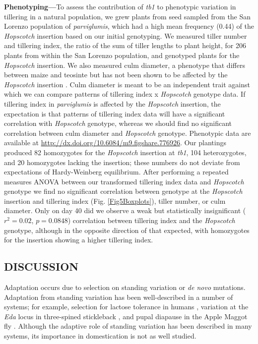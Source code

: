 \documentclass[11pt]{article} %
\begin{document}
\begin{linenumbers}
\begin{flushleft}
\textbf{Phenotyping---}To assess the contribution of \emph{tb1} to phenotypic variation in tillering in a natural population, we grew plants from seed sampled from the San Lorenzo population of \emph{parviglumis}, which had a high mean frequency (0.44) of the \emph{Hopscotch} insertion based on our initial genotyping. 
We measured tiller number and tillering index, the ratio of the sum of tiller lengths to plant height, for 206 plants from within the San Lorenzo population, and genotyped plants for the \emph{Hopscotch} insertion. 
We also measured culm diameter, a phenotype that differs between maize and teosinte but has not been shown to be affected by the \emph{Hopscotch} insertion \citep{Briggs2007}. Culm diameter is meant to be an independent trait against which we can compare patterns of tillering index x \emph{Hopscotch} genotype data. If tillering index in \emph{parviglumis} is affected by the \emph{Hopscotch} insertion, the expectation is that patterns of tillering index data will have a significant correlation with \emph{Hopscotch} genotype, whereas we should find no significant correlation between culm diameter and \emph{Hopscotch} genotype. 
Phenotypic data are available at \url{http://dx.doi.org/10.6084/m9.figshare.776926}. 
Our plantings produced 82 homozygotes for the \emph{Hopscotch} insertion at \emph{tb1}, 104 heterozygotes, and 20 homozygotes lacking the insertion; these numbers do not deviate from expectations of Hardy-Weinberg equilibrium. 
After performing a repeated measures ANOVA between our transformed tillering index data and \emph{Hopscotch} genotype we find no significant correlation between genotype at the \emph{Hopscotch} insertion and tillering index (Fig. \ref{Fig5Boxplots}), tiller number, or culm diameter. 
Only on day 40 did we observe a weak but statistically insignificant ($r^2= 0.02$, $p=0.0848$) correlation between tillering index and the \emph{Hopscotch} genotype, although in the opposite direction of that expected, with homozygotes for the insertion showing a higher tillering index.

\begin{centering}
\section*{DISCUSSION}
\end{centering}

Adaptation occurs due to selection on standing variation or \emph{de novo} mutations. Adaptation from standing variation has been well-described in a number of systems; for example, selection for lactose tolerance in humans \citep{Plantinga2012, Tishkoff2007}, variation at the \emph{Eda} locus in three-spined stickleback \citep{Kitano2008, Colosimo2005}, and pupal diapause in the Apple Maggot fly \citep{Feder2003}. Although the adaptive role of standing variation has been described in many systems, its importance in domestication is not as well studied. 


\end{flushleft}
\end{linenumbers}
\end{document}
